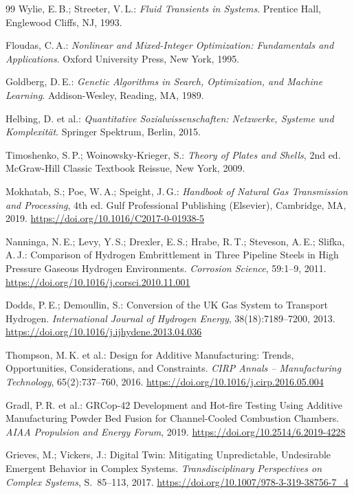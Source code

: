 ﻿\documentclass[12pt,a4paper,twoside]{article}
\theoremstyle{plain}
\theoremstyle{definition}
\theoremstyle{remark}
\begin{document}
\begin{thebibliography}{99}
Wylie, E.\,B.; Streeter, V.\,L.:
\textit{Fluid Transients in Systems}.
Prentice Hall, Englewood Cliffs, NJ, 1993.

Floudas, C.\,A.:
\textit{Nonlinear and Mixed-Integer Optimization: Fundamentals and Applications}.
Oxford University Press, New York, 1995.

Goldberg, D.\,E.:
\textit{Genetic Algorithms in Search, Optimization, and Machine Learning}.
Addison-Wesley, Reading, MA, 1989.

Helbing, D. et al.:
\textit{Quantitative Sozialwissenschaften: Netzwerke, Systeme und Komplexität}.
Springer Spektrum, Berlin, 2015.

Timoshenko, S.\,P.; Woinowsky-Krieger, S.:
\textit{Theory of Plates and Shells}, 2nd ed.
McGraw-Hill Classic Textbook Reissue, New York, 2009.

Mokhatab, S.; Poe, W.\,A.; Speight, J.\,G.:
\textit{Handbook of Natural Gas Transmission and Processing}, 4th ed.
Gulf Professional Publishing (Elsevier), Cambridge, MA, 2019.
\url{https://doi.org/10.1016/C2017-0-01938-5}

Nanninga, N.\,E.; Levy, Y.\,S.; Drexler, E.\,S.; Hrabe, R.\,T.;
Steveson, A.\,E.; Slifka, A.\,J.:
Comparison of Hydrogen Embrittlement in Three Pipeline Steels in High Pressure
Gaseous Hydrogen Environments.
\textit{Corrosion Science}, 59:1--9, 2011.
\url{https://doi.org/10.1016/j.corsci.2010.11.001}

Dodds, P.\,E.; Demoullin, S.:
Conversion of the UK Gas System to Transport Hydrogen.
\textit{International Journal of Hydrogen Energy}, 38(18):7189--7200, 2013.
\url{https://doi.org/10.1016/j.ijhydene.2013.04.036}

Thompson, M.\,K. et al.:
Design for Additive Manufacturing: Trends, Opportunities, Considerations,
and Constraints.
\textit{CIRP Annals -- Manufacturing Technology}, 65(2):737--760, 2016.
\url{https://doi.org/10.1016/j.cirp.2016.05.004}

Gradl, P.\,R. et al.:
GRCop-42 Development and Hot-fire Testing Using Additive Manufacturing Powder
Bed Fusion for Channel-Cooled Combustion Chambers.
\textit{AIAA Propulsion and Energy Forum}, 2019.
\url{https://doi.org/10.2514/6.2019-4228}

Grieves, M.; Vickers, J.:
Digital Twin: Mitigating Unpredictable, Undesirable Emergent Behavior in
Complex Systems.
\textit{Transdisciplinary Perspectives on Complex Systems}, S.\ 85--113, 2017.
\url{https://doi.org/10.1007/978-3-319-38756-7_4}


\end{thebibliography}
\end{document}
